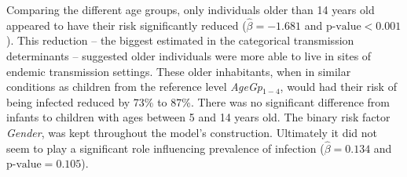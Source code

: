 Comparing the different age groups, only individuals older than 14 years old appeared to have their risk significantly reduced ($\hat{\beta}=-1.681$ and $\text{p-value}<0.001$).
This reduction -- the biggest estimated in the categorical transmission determinants -- suggested older individuals were more able to live in sites of endemic transmission settings.
These older inhabitants, when in similar conditions as children from the reference level \textit{AgeGp}$_{1-4}$, would had their risk of being infected reduced by 73\% to 87\%.
There was no significant difference from infants to children with ages between 5 and 14 years old.
The binary risk factor \textit{Gender}, was kept throughout the model's construction.
Ultimately it did not seem to play a significant role influencing prevalence of infection ($\hat{\beta}=0.134$ and $\text{p-value}=0.105$).

